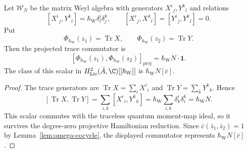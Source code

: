 \documentclass[11pt]{memoir}
\begin{document}
\begin{lem}\label{lem:projected-linear-weyl-trace-commutator}
  Let \(\mathcal W_N\) be the matrix Weyl algebra with generators
  \(X^i{}_j,Y^k{}_l\) and relations
  \[
    [X^i{}_j,Y^k{}_l]
      =\hbar_{\mathrm{W}}\delta^i_l\delta^k_j,\qquad
    [X^i{}_j,X^k{}_l]=[Y^i{}_j,Y^k{}_l]=0 .
  \]
  Put
  \[
    \Phi_{\hbar_{\mathrm{W}}}(z_1)=\operatorname{Tr}X,
    \qquad
    \Phi_{\hbar_{\mathrm{W}}}(z_2)=\operatorname{Tr}Y .
  \]
  Then the projected trace commutator is
  \[
    [\Phi_{\hbar_{\mathrm{W}}}(z_1),
     \Phi_{\hbar_{\mathrm{W}}}(z_2)]_{\mathrm{proj}}
     =
    \hbar_{\mathrm{W}}N\cdot\mathbf 1 .
  \]
  The class of this scalar in
  \(H^2_{\mathrm{Lie}}(\bar A,\C)[[\hbar_{\mathrm{W}}]]\) is
  \(\hbar_{\mathrm{W}}N[\bar c]\).
\end{lem}

\begin{proof}
  The trace generators are
  \(\operatorname{Tr}X=\sum_iX^i{}_i\) and
  \(\operatorname{Tr}Y=\sum_kY^k{}_k\).  Hence
  \[
    [\operatorname{Tr}X,\operatorname{Tr}Y]
    =
    \sum_{i,k}[X^i{}_i,Y^k{}_k]
    =
    \hbar_{\mathrm{W}}
    \sum_{i,k}\delta^i_k\delta^k_i
    =
    \hbar_{\mathrm{W}}N .
  \]
  This scalar commutes with the traceless quantum moment-map ideal, so
  it survives the degree-zero projective Hamiltonian reduction.  Since
  \(\bar c(\bar z_1,\bar z_2)=1\) by
  Lemma~\ref{lem:omega-cocycle}, the displayed commutator represents
  \(\hbar_{\mathrm{W}}N[\bar c]\).
\end{proof}
\end{document}
